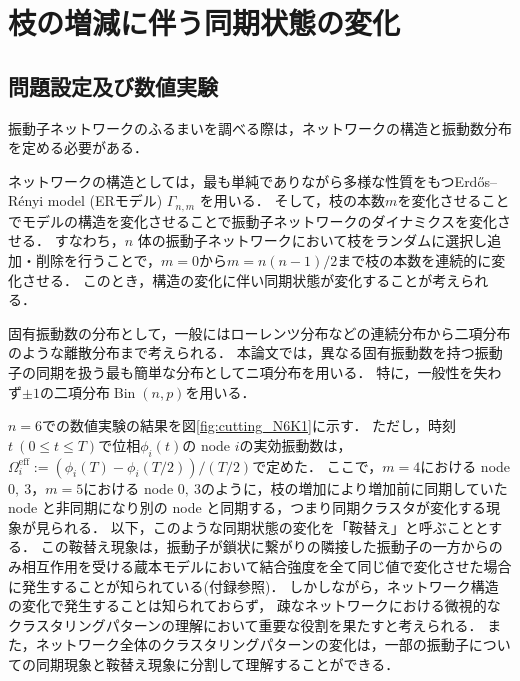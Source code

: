\documentclass[../main]{subfiles}
\begin{document}
\chapter{枝の増減に伴う同期状態の変化}
\label{chap:method-3body}
\section{問題設定及び数値実験}
\label{sec:method-3body-settting}
振動子ネットワークのふるまいを調べる際は，ネットワークの構造と振動数分布を定める必要がある．

ネットワークの構造としては，最も単純でありながら多様な性質をもつErd\H{o}s–R\'{e}nyi model (ERモデル) $\Gamma_{n,m}$ を用いる．
そして，枝の本数$m$を変化させることでモデルの構造を変化させることで振動子ネットワークのダイナミクスを変化させる．
すなわち，$n$ 体の振動子ネットワークにおいて枝をランダムに選択し追加・削除を行うことで，$m=0$から$m=n(n-1)/2$まで枝の本数を連続的に変化させる．
このとき，構造の変化に伴い同期状態が変化することが考えられる．

固有振動数の分布として，一般にはローレンツ分布などの連続分布\cite{kuramoto1975}から二項分布のような離散分布\cite{1992BonillaNeuSpigler}まで考えられる．
本論文では，異なる固有振動数を持つ振動子の同期を扱う最も簡単な分布としてニ項分布を用いる．
特に，一般性を失わず$\pm 1$の二項分布$\operatorname{Bin}(n,p)$を用いる．

$n=6$での数値実験の結果を図\ref{fig:cutting_N6K1}に示す．
ただし，時刻$t\ (0\leq t\leq T)$で位相$\phi_i(t)$の node $i$の実効振動数は，$\Omega_i^{\mathrm{eff}}:=(\phi_i(T)-\phi_i(T/2))/(T/2)$で定めた．
ここで，$m=4$における node $0,\ 3$，$m=5$における node $0,\ 3$のように，枝の増加により増加前に同期していた node と非同期になり別の node と同期する，つまり同期クラスタが変化する現象が見られる．
以下，このような同期状態の変化を「鞍替え」と呼ぶこととする．
この鞍替え現象は，振動子が鎖状に繋がりの隣接した振動子の一方からのみ相互作用を受ける蔵本モデルにおいて結合強度を全て同じ値で変化させた場合に発生することが知られている\cite{XiaHuang:130506}(付録参照)．
しかしながら，ネットワーク構造の変化で発生することは知られておらず，
疎なネットワークにおける微視的なクラスタリングパターンの理解において重要な役割を果たすと考えられる．
また，ネットワーク全体のクラスタリングパターンの変化は，一部の振動子についての同期現象と鞍替え現象に分割して理解することができる．
\end{document}
